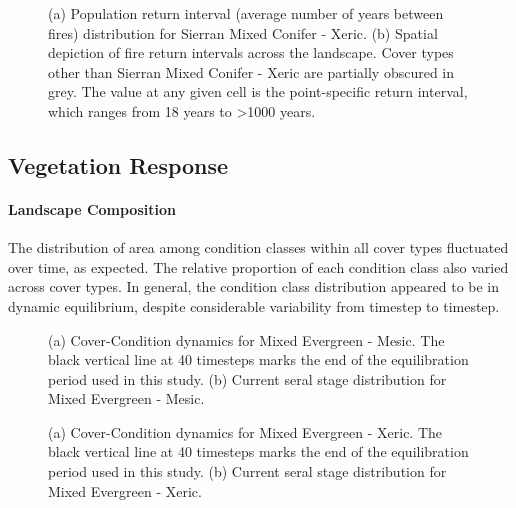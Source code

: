 \begin{figure}[!htbp]
  \centering
  \caption{(a) Population return interval (average number of years between fires) distribution for Sierran Mixed Conifer - Xeric.  (b) Spatial depiction of fire return intervals across the landscape. Cover types other than Sierran Mixed Conifer - Xeric are partially obscured in grey. The value at any given cell is the point-specific return interval, which ranges from 18 years to \textgreater 1000 years.}
\label{fig:preturn_smcx}
\end{figure}

\newpage
\subsection{Vegetation Response}
\label{subsec:HRVvegresponse}

\paragraph{Landscape Composition}

The distribution of area among condition classes within all cover types fluctuated over time, as expected. The relative proportion of each condition class also varied across cover types. In general, the condition class distribution appeared to be in dynamic equilibrium, despite considerable variability from timestep to timestep. 

\begin{figure}[!htbp]
  \centering
  \caption{(a) Cover-Condition dynamics for Mixed Evergreen - Mesic. The black vertical line at 40 timesteps marks the end of the equilibration period used in this study. (b) Current seral stage distribution for Mixed Evergreen - Mesic.}
\label{fig:covcond_megm}
\end{figure}

\begin{figure}[!htbp]
  \centering
  \caption{(a) Cover-Condition dynamics for Mixed Evergreen - Xeric. The black vertical line at 40 timesteps marks the end of the equilibration period used in this study. (b) Current seral stage distribution for Mixed Evergreen - Xeric.} 
  \label{fig:covcond_megx}
\end{figure}

